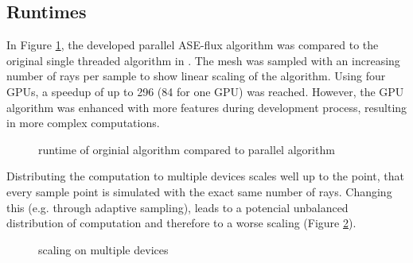 \subsection{Runtimes}
In Figure \ref{plot:runtime}, the developed parallel ASE-flux algorithm was compared to 
the original single threaded algorithm in
\cite{ASE2010}. The mesh was sampled with an increasing number of rays per sample
to show linear scaling of the algorithm. Using four GPUs, a speedup of up to 
296 (84 for one GPU) was reached. However, the GPU algorithm was enhanced with
more features during development process, resulting in more complex computations.
\begin{figure}[H]
  \centerline{
    }
  \caption{runtime of orginial algorithm compared to parallel algorithm}
  \label{plot:runtime}
\end{figure}
Distributing the computation to multiple devices scales well up to the
point, that every sample point is simulated with the exact same number
of rays. Changing this (e.g. through adaptive sampling), leads to
a potencial unbalanced distribution of computation and therefore to
a worse scaling (Figure \ref{plot:gpu_scaling}).
\begin{figure}[H]
  \centerline{
    }
  \caption{scaling on multiple devices}
  \label{plot:gpu_scaling}
\end{figure}
